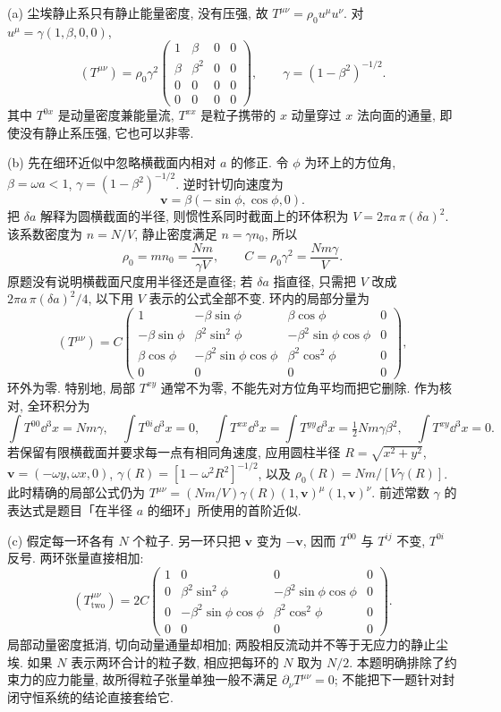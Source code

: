 \begin{solution}
(a) 尘埃静止系只有静止能量密度, 没有压强, 故 $T^{\mu\nu}=\rho_0u^\mu u^\nu$. 对 $u^\mu=\gamma(1,\beta,0,0)$,
\[
 (T^{\mu\nu})=\rho_0\gamma^2
 \begin{pmatrix}1&\beta&0&0\\\beta&\beta^2&0&0\\0&0&0&0\\0&0&0&0\end{pmatrix},
 \qquad\gamma=(1-\beta^2)^{-1/2}.
\]
其中 $T^{0x}$ 是动量密度兼能量流, $T^{xx}$ 是粒子携带的 $x$ 动量穿过 $x$ 法向面的通量, 即使没有静止系压强, 它也可以非零.

(b) 先在细环近似中忽略横截面内相对 $a$ 的修正. 令 $\phi$ 为环上的方位角, $\beta=\omega a<1$, $\gamma=(1-\beta^2)^{-1/2}$. 逆时针切向速度为
\[
 \boldsymbol v=\beta(-\sin\phi,\cos\phi,0).
\]
把 $\delta a$ 解释为圆横截面的半径, 则惯性系同时截面上的环体积为 $V=2\pi a\,\pi(\delta a)^2$. 该系数密度为 $n=N/V$, 静止密度满足 $n=\gamma n_0$, 所以
\[
 \rho_0=mn_0=\frac{Nm}{\gamma V},\qquad
 C=\rho_0\gamma^2=\frac{Nm\gamma}{V}.
\]
原题没有说明横截面尺度用半径还是直径; 若 $\delta a$ 指直径, 只需把 $V$ 改成 $2\pi a\,\pi(\delta a)^2/4$, 以下用 $V$ 表示的公式全部不变. 环内的局部分量为
\[
 (T^{\mu\nu})=C
 \begin{pmatrix}
 1&-\beta\sin\phi&\beta\cos\phi&0\\
 -\beta\sin\phi&\beta^2\sin^2\phi&-\beta^2\sin\phi\cos\phi&0\\
 \beta\cos\phi&-\beta^2\sin\phi\cos\phi&\beta^2\cos^2\phi&0\\
 0&0&0&0
 \end{pmatrix},
\]
环外为零. 特别地, 局部 $T^{xy}$ 通常不为零, 不能先对方位角平均而把它删除. 作为核对, 全环积分为
\[
 \int T^{00}\dd^3x=Nm\gamma,\quad
 \int T^{0i}\dd^3x=0,\quad
 \int T^{xx}\dd^3x=\int T^{yy}\dd^3x=\tfrac12Nm\gamma\beta^2,
 \quad\int T^{xy}\dd^3x=0.
\]
若保留有限横截面并要求每一点有相同角速度, 应用圆柱半径 $R=\sqrt{x^2+y^2}$, $\boldsymbol v=(-\omega y,\omega x,0)$, $\gamma(R)=[1-\omega^2R^2]^{-1/2}$, 以及 $\rho_0(R)=Nm/[V\gamma(R)]$. 此时精确的局部公式仍为 $T^{\mu\nu}=(Nm/V)\gamma(R)(1,\boldsymbol v)^\mu(1,\boldsymbol v)^\nu$. 前述常数 $\gamma$ 的表达式是题目「在半径 $a$ 的细环」所使用的首阶近似.

(c) 假定每一环各有 $N$ 个粒子. 另一环只把 $\boldsymbol v$ 变为 $-\boldsymbol v$, 因而 $T^{00}$ 与 $T^{ij}$ 不变, $T^{0i}$ 反号. 两环张量直接相加:
\[
 (T^{\mu\nu}_{\mathrm{two}})=2C
 \begin{pmatrix}
 1&0&0&0\\
 0&\beta^2\sin^2\phi&-\beta^2\sin\phi\cos\phi&0\\
 0&-\beta^2\sin\phi\cos\phi&\beta^2\cos^2\phi&0\\
 0&0&0&0
 \end{pmatrix}.
\]
局部动量密度抵消, 切向动量通量却相加; 两股相反流动并不等于无应力的静止尘埃. 如果 $N$ 表示两环合计的粒子数, 相应把每环的 $N$ 取为 $N/2$. 本题明确排除了约束力的应力能量, 故所得粒子张量单独一般不满足 $\partial_\nu T^{\mu\nu}=0$; 不能把下一题针对封闭守恒系统的结论直接套给它.
\end{solution}

